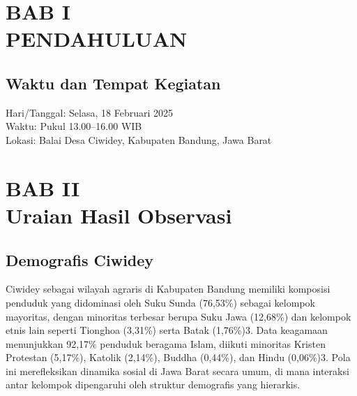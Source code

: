 \documentclass[a4paper,12pt, left=3cm,right=2cm,bottom=2cm, bahasa]{article}
\begin{document}

\pagebreak
{}
\setcounter{page}{1}
\setcounter{section}{1}


\section*{BAB I \\PENDAHULUAN}
\subsection{Waktu dan Tempat Kegiatan}
Hari/Tanggal: Selasa, 18 Februari 2025 \\
Waktu: Pukul 13.00–16.00 WIB \\
Lokasi: Balai Desa Ciwidey, Kabupaten Bandung, Jawa Barat \\

\setcounter{subsection}{0}
\setcounter{section}{2}
\section*{BAB II \\ Uraian Hasil Observasi}
\subsection{Demografis Ciwidey}
Ciwidey sebagai wilayah agraris di Kabupaten Bandung memiliki komposisi penduduk yang didominasi oleh Suku Sunda (76,53\%) sebagai kelompok mayoritas, dengan minoritas terbesar berupa Suku Jawa (12,68\%) dan kelompok etnis lain seperti Tionghoa (3,31\%) serta Batak (1,76\%)3. Data keagamaan menunjukkan 92,17\% penduduk beragama Islam, diikuti minoritas Kristen Protestan (5,17\%), Katolik (2,14\%), Buddha (0,44\%), dan Hindu (0,06\%)3. Pola ini merefleksikan dinamika sosial di Jawa Barat secara umum, di mana interaksi antar kelompok dipengaruhi oleh struktur demografis yang hierarkis.
\end{document}
